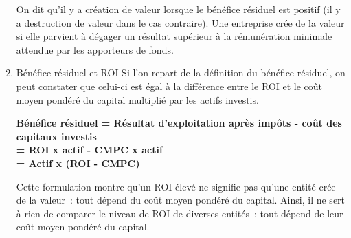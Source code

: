 \documentclass{tufte-handout}
\begin{document}
\begin{enumerate}
On dit qu'il y a création de valeur lorsque le bénéfice résiduel est positif (il y a destruction de valeur dans le cas contraire). Une entreprise crée de la valeur si elle parvient à dégager un résultat supérieur à la rémunération minimale attendue par les apporteurs de fonds.\\

\item Bénéfice résiduel et ROI
\label{sec:orgbf23eab}
Si l'on repart de la définition du bénéfice résiduel, on peut constater que celui-ci est égal à la différence entre le ROI et le coût moyen pondéré du capital multiplié par les actifs investis.\\
\begin{center}
\textbf{Bénéfice résiduel = Résultat d'exploitation après impôts - coût des\\
capitaux investis}\\
\textbf{= ROI x actif - CMPC x actif}\\
\textbf{= Actif x (ROI - CMPC)}\\
\end{center}
Cette formulation montre qu'un ROI élevé ne signifie pas qu'une entité crée de la valeur : tout dépend du coût moyen pondéré du capital. Ainsi, il ne sert à rien de comparer le niveau de ROI de diverses entités : tout dépend de leur coût moyen pondéré du capital.\\


\end{enumerate}
\end{document}
